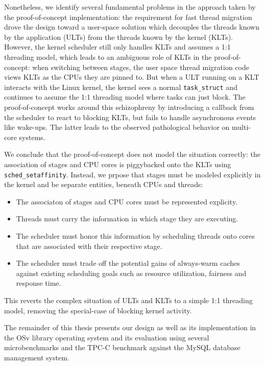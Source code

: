 \documentclass[12pt,a4paper]{book}
\begin{document}
Nonetheless, we identify several fundamental problems in the approach taken by the proof-of-concept implementation:
the requirement for fast thread migration drove the design toward a user-space solution which decouples the threads known by the application (ULTs) from the threads known by the kernel (KLTs).
However, the kernel scheduler still only handles KLTs and assumes a 1:1 threading model, which leads to an ambiguous role of KLTs in the proof-of-concept:
when switching between stages, the user space thread migration code views KLTs as the CPUs they are pinned to.
But when a ULT running on a KLT interacts with the Linux kernel, the kernel sees a normal \texttt{task\_struct} and continues to assume the 1:1 threading model where tasks can just block.
The proof-of-concept works around this schizophreny by introducing a callback from the scheduler to react to blocking KLTs, but fails to handle asynchronous events like wake-ups.
The latter leads to the observed pathological behavior on multi-core systems.

We conclude that the proof-of-concept does not model the situation correctly: the association of stages and CPU cores is piggybacked onto the KLTs using \texttt{sched\_setaffinity}.
Instead, we prpose that stages must be modeled explicitly in the kernel and be separate entities, beneath CPUs and threads:
\begin{itemize}%
    \item The associaton of stages and CPU cores must be represented explicity.
    \item Threads must carry the information in which stage they are executing.
    \item The scheduler must honor this information by scheduling threads onto cores that are associated with their respective stage.
    \item The scheduler must trade off the potential gains of always-warm caches against existing scheduling goals such as resource utilization, fairness and response time.
\end{itemize}%
This reverts the complex situation of ULTs and KLTs to a simple 1:1 threading model, removing the special-case of blocking kernel activity.

The remainder of this thesis presents our design as well as its implementation in the OSv library operating system and its evaluation using several microbenchmarks and the TPC-C benchmark against the MySQL database management system.
\end{document}
